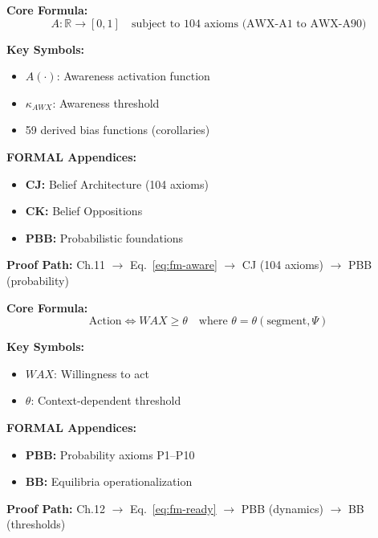 \begin{tcolorbox}[colback=blue!3!white, colframe=blue!60!black,
    title=\textbf{Chapter 11: AWARE (Awareness)}]

\textbf{Core Formula:}
\begin{equation}
A: \mathbb{R} \rightarrow [0,1] \quad \text{subject to 104 axioms (AWX-A1 to AWX-A90)}
\label{eq:fm-aware}
\end{equation}

\textbf{Key Symbols:}
\begin{itemize}[nosep]
    \item $A(\cdot)$: Awareness activation function
    \item $\kappa_{AWX}$: Awareness threshold
    \item 59 derived bias functions (corollaries)
\end{itemize}

\textbf{FORMAL Appendices:}
\begin{itemize}[nosep]
    \item \textbf{CJ:} Belief Architecture (104 axioms)
    \item \textbf{CK:} Belief Oppositions
    \item \textbf{PBB:} Probabilistic foundations
\end{itemize}

\textbf{Proof Path:} Ch.11 $\rightarrow$ Eq.~\ref{eq:fm-aware} $\rightarrow$ CJ (104 axioms) $\rightarrow$ PBB (probability)

\end{tcolorbox}

\begin{tcolorbox}[colback=blue!3!white, colframe=blue!60!black,
    title=\textbf{Chapter 12: READY (Willingness)}]

\textbf{Core Formula:}
\begin{equation}
\text{Action} \Leftrightarrow WAX \geq \theta \quad \text{where } \theta = \theta(\text{segment}, \Psi)
\label{eq:fm-ready}
\end{equation}

\textbf{Key Symbols:}
\begin{itemize}[nosep]
    \item $WAX$: Willingness to act
    \item $\theta$: Context-dependent threshold
\end{itemize}

\textbf{FORMAL Appendices:}
\begin{itemize}[nosep]
    \item \textbf{PBB:} Probability axioms P1--P10
    \item \textbf{BB:} Equilibria operationalization
\end{itemize}

\textbf{Proof Path:} Ch.12 $\rightarrow$ Eq.~\ref{eq:fm-ready} $\rightarrow$ PBB (dynamics) $\rightarrow$ BB (thresholds)

\end{tcolorbox}

